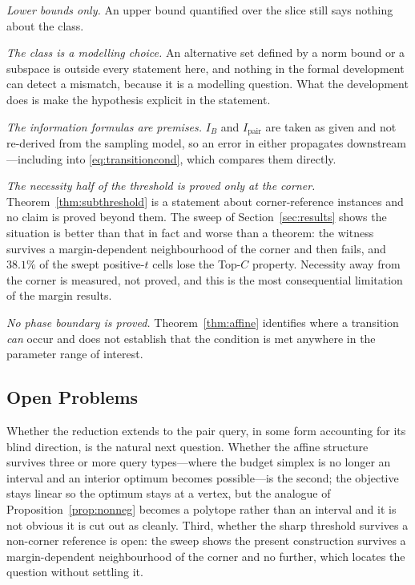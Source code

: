 \documentclass[conference]{IEEEtran}
\theoremstyle{definition}
\begin{document}
\emph{Lower bounds only.} An upper bound quantified over the slice still says nothing about
the class.

\emph{The class is a modelling choice.} An alternative set defined by a norm bound or a
subspace is outside every statement here, and nothing in the formal development can detect a
mismatch, because it is a modelling question. What the development does is make the
hypothesis explicit in the statement.

\emph{The information formulas are premises.} $I_{B}$ and $I_{\mathrm{pair}}$ are taken as
given and not re-derived from the sampling model, so an error in either propagates
downstream---including into \eqref{eq:transitioncond}, which compares them directly.

\emph{The necessity half of the threshold is proved only at the corner.}
Theorem~\ref{thm:subthreshold} is a statement about corner-reference instances and no claim is
proved beyond them. The sweep of Section~\ref{sec:results} shows the situation is better than
that in fact and worse than a theorem: the witness survives a margin-dependent neighbourhood of
the corner and then fails, and $38.1\%$ of the swept positive-$t$ cells lose the Top-$C$
property. Necessity away from the corner is measured, not proved, and this is the most
consequential limitation of the margin results.

\emph{No phase boundary is proved.} Theorem~\ref{thm:affine} identifies where a transition
\emph{can} occur and does not establish that the condition is met anywhere in the parameter
range of interest.

\subsection{Open Problems}

Whether the reduction extends to the pair query, in some form accounting for its blind
direction, is the natural next question. Whether the affine structure survives three or more
query types---where the budget simplex is no longer an interval and an interior optimum
becomes possible---is the second; the objective stays linear so the optimum stays at a
vertex, but the analogue of Proposition~\ref{prop:nonneg} becomes a polytope rather than an
interval and it is not obvious it is cut out as cleanly. Third, whether the sharp threshold
survives a non-corner reference is open: the sweep shows the present construction survives a
margin-dependent neighbourhood of the corner and no further, which locates the question
without settling it.
\end{document}
